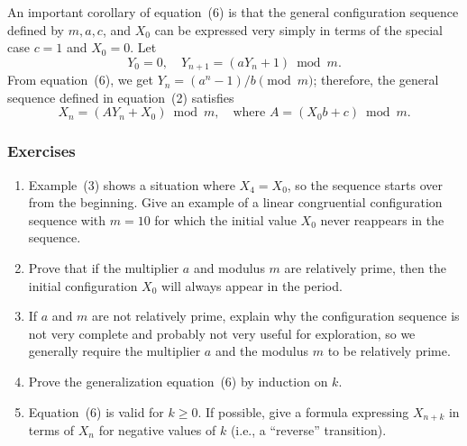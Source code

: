 \documentclass[12pt]{article}
\begin{document}
An important corollary of equation~(6) is that the general configuration sequence defined by $m, a, c$, and $X_0$ can be expressed very simply in terms of the special case $c = 1$ and $X_0 = 0$. Let
\begin{equation}
Y_0 = 0, \quad Y_{n+1} = (aY_n + 1) \bmod m. \tag{7}
\end{equation}
From equation~(6), we get $Y_n = (a^n - 1)/b \pmod{m}$; therefore, the general sequence defined in equation~(2) satisfies
\begin{equation}
X_n = (AY_n + X_0) \bmod m, \quad \text{where } A = (X_0 b + c) \bmod m. \tag{8}
\end{equation}

\subsubsection*{Exercises}
\begin{enumerate}
\item[\textbf{1.}] [10] Example~(3) shows a situation where $X_4 = X_0$, so the sequence starts over from the beginning. Give an example of a linear congruential configuration sequence with $m = 10$ for which the initial value $X_0$ never reappears in the sequence.

\item[\textbf{2.}] [$M20$] Prove that if the multiplier $a$ and modulus $m$ are relatively prime, then the initial configuration $X_0$ will always appear in the period.

\item[\textbf{3.}] [$M10$] If $a$ and $m$ are not relatively prime, explain why the configuration sequence is not very complete and probably not very useful for exploration, so we generally require the multiplier $a$ and the modulus $m$ to be relatively prime.

\item[\textbf{4.}] [11] Prove the generalization equation~(6) by induction on $k$.

\item[\textbf{5.}] [$M20$] Equation~(6) is valid for $k \geq 0$. If possible, give a formula expressing $X_{n+k}$ in terms of $X_n$ for negative values of $k$ (i.e., a ``reverse'' transition).
\end{enumerate}


\end{document}
